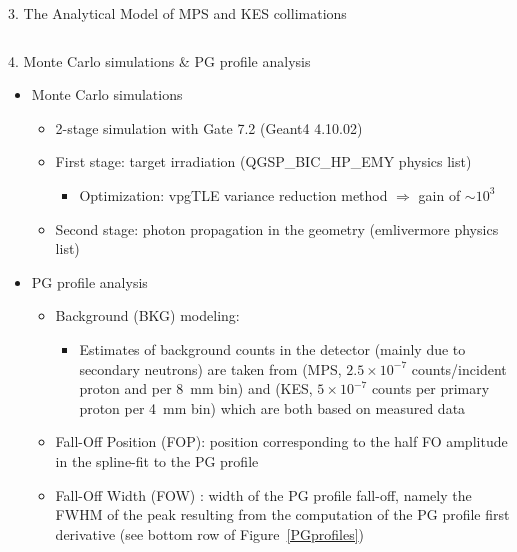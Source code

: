 \documentclass[final]{beamer} %
\begin{document}
\begin{frame}{}
\begin{columns}[t]
\begin{column}{0.49\textwidth}
\begin{block}{3. The Analytical Model of MPS and KES collimations}
\begin{columns}[t]
\begin{column}{0.49\textwidth}
				\end{column}
			\end{columns}
	  \end{block}
		
	  \begin{block}{4. Monte Carlo simulations \& PG profile analysis}
			
			\begin{itemize}
				\item Monte Carlo simulations
				\begin{itemize}
					\item 2-stage simulation with Gate 7.2 (Geant4 4.10.02)
					\item First stage: target irradiation (QGSP\_BIC\_HP\_EMY physics list)
					\begin{itemize}
						\item Optimization: vpgTLE variance reduction method $\Rightarrow$ gain of $\sim 10^3$ \cite{Huisman2016}
					\end{itemize}
					\item Second stage: photon propagation in the geometry (emlivermore physics list)
				\end{itemize}					
				\item PG profile analysis
				\begin{itemize}				
					\item Background (BKG) modeling: 
					\begin{itemize}
						\item Estimates of background counts in the detector (mainly due to secondary neutrons) are taken from \cite{Pinto2014} (MPS, $2.5\times10^{-7}$ counts/incident proton and per 8~mm bin) and \cite{Perali2014} (KES, $5 \times 10^{-7}$ counts per primary proton per 4~mm bin) which are both based on measured data
					\end{itemize}				
					\item Fall-Off Position (FOP): position corresponding to the half FO amplitude in the spline-fit to the PG profile
					\item Fall-Off Width (FOW) : width of the PG profile fall-off, namely the FWHM of the peak resulting from the computation of the PG profile first derivative (see bottom row of Figure~\ref{PGprofiles})
			\end{itemize}



			\end{itemize}


\end{block}
\end{column}
\end{columns}
\end{frame}
\end{document}
